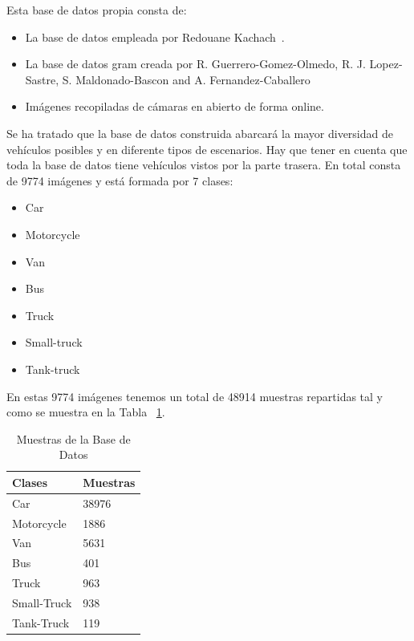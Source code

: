 Esta base de datos propia consta de:
\begin{itemize}
    \item La base de datos empleada por Redouane Kachach~\cite{traffic_monitor_lab}.
    \item La base de datos \acrfull{gram} creada por R. Guerrero-Gomez-Olmedo, R. J. Lopez-Sastre, S. Maldonado-Bascon and A. Fernandez-Caballero~\cite{guerrero2013iwinac} 
    \item Imágenes recopiladas de cámaras en abierto de forma online.
\end{itemize} 

Se ha tratado que la base de datos construida abarcará la mayor diversidad de vehículos posibles y en diferente tipos de escenarios. Hay que tener en cuenta que toda la base de datos tiene vehículos vistos por la parte trasera. En total consta de 9774 imágenes y está formada por 7 clases:
\begin{itemize}
    \item Car
    \item Motorcycle
    \item Van
    \item Bus
    \item Truck
    \item Small-truck
    \item Tank-truck
\end{itemize}

En estas 9774 imágenes tenemos un total de 48914 muestras repartidas tal y como se muestra en la Tabla ~\ref{tabla_muestras}.

\begin{table}[htbp]
\begin{center}
\begin{tabular}{|l|l|}
\hline
Clases & Muestras \\
\hline \hline
Car & 38976 \\ \hline
Motorcycle & 1886 \\ \hline
Van & 5631 \\ \hline
Bus & 401 \\ \hline
Truck & 963 \\ \hline
Small-Truck & 938 \\ \hline
Tank-Truck & 119 \\ \hline
\end{tabular}
\caption{Muestras de la Base de Datos}
\label{tabla_muestras}
\end{center}
\end{table}


